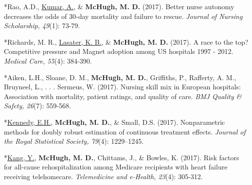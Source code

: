 \documentclass[10pt,]{article}
\begin{document}
{{{{{{{{{{{{{{{\begin{hangparas}{.25in}{1}

*Rao, A.D., {\underline {Kumar, A.}}, \& {\textbf {McHugh, M. D.}} (2017). Better nurse autonomy decreases the odds of 30-day mortality and failure to rescue. {\textit {Journal of Nursing Scholarship, 49}}(1): 73-79.

\end{hangparas}

\vspace{4mm}

\begin{hangparas}{.25in}{1}

*Richards, M. R., {\underline {Lasater, K. B.}}, \& {\textbf {McHugh, M. D.}} (2017). A race to the top? Competitive pressure and Magnet adoption among US hospitals 1997 - 2012. {\textit {Medical Care, 55}}(4): 384-390.

\end{hangparas}

\vspace{4mm}

\begin{hangparas}{.25in}{1}

*Aiken, L.H., Sloane, D. M., {\textbf {McHugh, M. D.}}, Griffiths, P., Rafferty, A. M., Bruyneel, L., . . . Sermeus, W. (2017). Nursing skill mix in European hospitals: Association with mortality, patient ratings, and quality of care. {\textit {BMJ Quality \& Safety, 26}}(7): 559-568.

\end{hangparas}

\vspace{4mm}

\begin{hangparas}{.25in}{1}

*{\underline {Kennedy, E.H.}}, {\textbf {McHugh, M. D.}}, \& Small, D.S. (2017). Nonparametric methods for doubly robust estimation of continuous treatment effects. {\textit {Journal of the Royal Statistical Society, 79}}(4): 1229–1245.

\end{hangparas}

\vspace{4mm}

\begin{hangparas}{.25in}{1}

*{\underline {Kang, Y.}}, {\textbf {McHugh, M. D.}}, Chittams, J., \& Bowles, K. (2017). Risk factors for all-cause rehospitalization among Medicare recipients with heart failure receiving telehomecare. {\textit {Telemedicine and e-Health, 23}}(4): 305-312.


\end{hangparas}}}}}}}}}}}}}}}}
\end{document}

